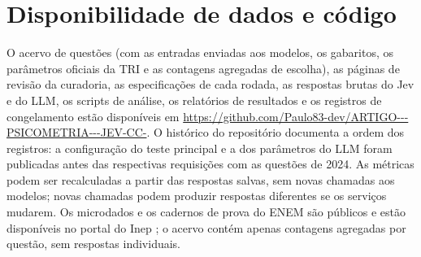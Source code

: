 
\section*{Disponibilidade de dados e código}

O acervo de questões (com as entradas enviadas aos modelos, os gabaritos, os parâmetros oficiais da TRI e as contagens agregadas de escolha), as páginas de revisão da curadoria, as especificações de cada rodada, as respostas brutas do Jev e do LLM, os scripts de análise, os relatórios de resultados e os registros de congelamento estão disponíveis em \url{https://github.com/Paulo83-dev/ARTIGO---PSICOMETRIA---JEV-CC-}. O histórico do repositório documenta a ordem dos registros: a configuração do teste principal e a dos parâmetros do LLM foram publicadas antes das respectivas requisições com as questões de 2024. As métricas podem ser recalculadas a partir das respostas salvas, sem novas chamadas aos modelos; novas chamadas podem produzir respostas diferentes se os serviços mudarem. Os microdados e os cadernos de prova do ENEM são públicos e estão disponíveis no portal do Inep \citep{inep2025microdados2024,inep2026microdados2025}; o acervo contém apenas contagens agregadas por questão, sem respostas individuais.
